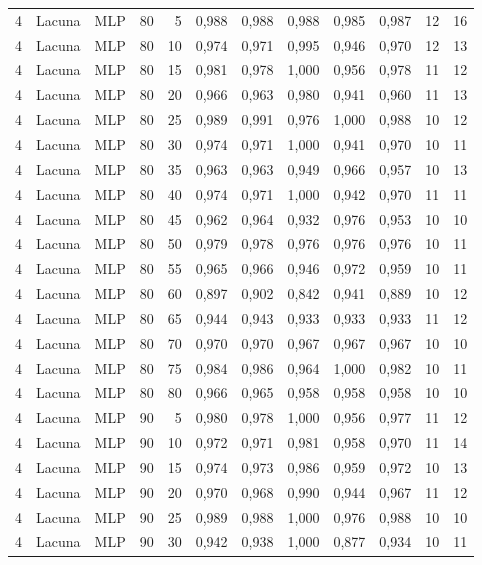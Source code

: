 \begin{longtable}{@{}rllrrrrrrrrr@{}}
4 & Lacuna & MLP & 80 & 5 & 0,988 & 0,988 & 0,988 & 0,985 & 0,987 & 12 & 16 \\
4 & Lacuna & MLP & 80 & 10 & 0,974 & 0,971 & 0,995 & 0,946 & 0,970 & 12 & 13 \\
4 & Lacuna & MLP & 80 & 15 & 0,981 & 0,978 & 1,000 & 0,956 & 0,978 & 11 & 12 \\
4 & Lacuna & MLP & 80 & 20 & 0,966 & 0,963 & 0,980 & 0,941 & 0,960 & 11 & 13 \\
4 & Lacuna & MLP & 80 & 25 & 0,989 & 0,991 & 0,976 & 1,000 & 0,988 & 10 & 12 \\
4 & Lacuna & MLP & 80 & 30 & 0,974 & 0,971 & 1,000 & 0,941 & 0,970 & 10 & 11 \\
4 & Lacuna & MLP & 80 & 35 & 0,963 & 0,963 & 0,949 & 0,966 & 0,957 & 10 & 13 \\
4 & Lacuna & MLP & 80 & 40 & 0,974 & 0,971 & 1,000 & 0,942 & 0,970 & 11 & 11 \\
4 & Lacuna & MLP & 80 & 45 & 0,962 & 0,964 & 0,932 & 0,976 & 0,953 & 10 & 10 \\
4 & Lacuna & MLP & 80 & 50 & 0,979 & 0,978 & 0,976 & 0,976 & 0,976 & 10 & 11 \\
4 & Lacuna & MLP & 80 & 55 & 0,965 & 0,966 & 0,946 & 0,972 & 0,959 & 10 & 11 \\
4 & Lacuna & MLP & 80 & 60 & 0,897 & 0,902 & 0,842 & 0,941 & 0,889 & 10 & 12 \\
4 & Lacuna & MLP & 80 & 65 & 0,944 & 0,943 & 0,933 & 0,933 & 0,933 & 11 & 12 \\
4 & Lacuna & MLP & 80 & 70 & 0,970 & 0,970 & 0,967 & 0,967 & 0,967 & 10 & 10 \\
4 & Lacuna & MLP & 80 & 75 & 0,984 & 0,986 & 0,964 & 1,000 & 0,982 & 10 & 11 \\
4 & Lacuna & MLP & 80 & 80 & 0,966 & 0,965 & 0,958 & 0,958 & 0,958 & 10 & 10 \\
4 & Lacuna & MLP & 90 & 5 & 0,980 & 0,978 & 1,000 & 0,956 & 0,977 & 11 & 12 \\
4 & Lacuna & MLP & 90 & 10 & 0,972 & 0,971 & 0,981 & 0,958 & 0,970 & 11 & 14 \\
4 & Lacuna & MLP & 90 & 15 & 0,974 & 0,973 & 0,986 & 0,959 & 0,972 & 10 & 13 \\
4 & Lacuna & MLP & 90 & 20 & 0,970 & 0,968 & 0,990 & 0,944 & 0,967 & 11 & 12 \\
4 & Lacuna & MLP & 90 & 25 & 0,989 & 0,988 & 1,000 & 0,976 & 0,988 & 10 & 10 \\
4 & Lacuna & MLP & 90 & 30 & 0,942 & 0,938 & 1,000 & 0,877 & 0,934 & 10 & 11 \\

\end{longtable}
